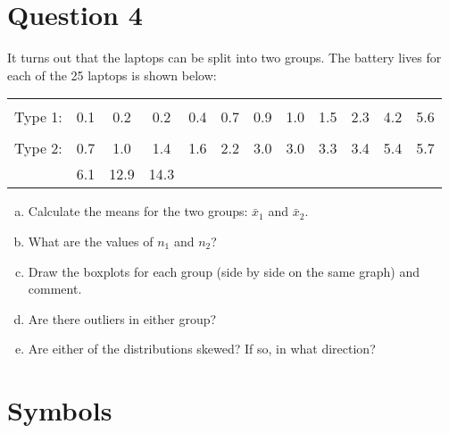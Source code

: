 \section{Question 4}
\begin{frame}{\bf {}}
It turns out that the laptops can be split into two groups. The battery lives for each of the 25 laptops is shown below:\vspace{-0.2cm}
\begin{adjustwidth}{-0.3cm}{}
\begin{tabular}{|cccccccccccc|}
\hline
&&&&&&&&&&&\\[-0.4cm]
Type 1: & 0.1 & 0.2 & 0.2 & 0.4 & 0.7 & 0.9 & 1.0 & 1.5 & 2.3 & 4.2 & 5.6 \\[0.1cm]
\hline
&&&&&&&&&&&\\[-0.4cm]
Type 2: & 0.7 & 1.0 & 1.4 & 1.6 & 2.2 & 3.0 & 3.0 & 3.3 & 3.4 & 5.4 & 5.7 \\
& 6.1 & 12.9 & 14.3 &&&&&&&&\\
\hline
\end{tabular}
\end{adjustwidth}
\begin{enumerate}[a)]\itemsep0.3cm
\item Calculate the means for the two groups: $\bar x_1$ and $\bar x_2$.
\item What are the values of $n_1$ and $n_2$?
\item Draw the boxplots for each group (side by side on the same graph) and comment.
\item Are there outliers in either group?
\item Are either of the distributions skewed? If so, in what direction?
\end{enumerate}
\end{frame}



\section{Symbols}
